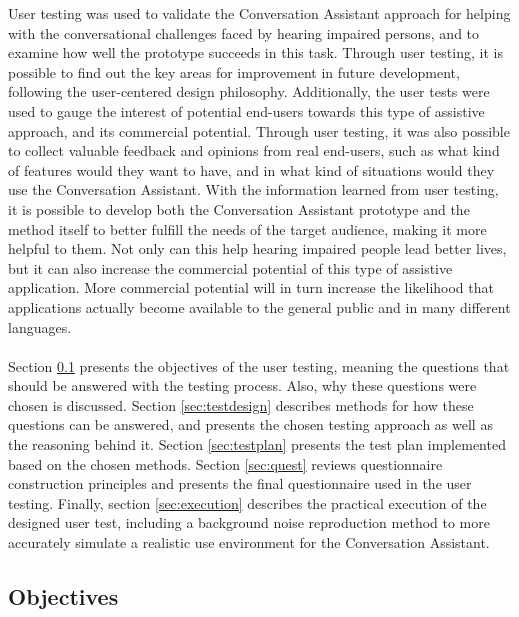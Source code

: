 \documentclass[english, 12pt, a4paper, pdftex, elec, utf8]{aaltothesis}
\begin{document}
User testing was used to validate the Conversation Assistant approach for helping with the conversational challenges faced by hearing impaired persons, and to examine how well the prototype succeeds in this task. Through user testing, it is possible to find out the key areas for improvement in future development, following the user-centered design philosophy. Additionally, the user tests were used to gauge the interest of potential end-users towards this type of assistive approach, and its commercial potential. Through user testing, it was also possible to collect valuable feedback and opinions from real end-users, such as what kind of features would they want to have, and in what kind of situations would they use the Conversation Assistant. With the information learned from user testing, it is possible to develop both the Conversation Assistant prototype and the method itself  to better fulfill the needs of the target audience, making it more helpful to them. Not only can this help hearing impaired people lead better lives, but it can also increase the commercial potential of this type of assistive application. More commercial potential will in turn increase the likelihood that applications actually become available to the general public and in many different languages. \\\\
Section \ref{sec:objectives} presents the objectives of the user testing, meaning the questions that should be answered with the testing process. Also, why these questions were chosen is discussed. Section \ref{sec:testdesign} describes methods for how these questions can be answered, and presents the chosen testing approach as well as the reasoning behind it. Section \ref{sec:testplan} presents the test plan implemented based on the chosen methods. Section \ref{sec:quest} reviews questionnaire construction principles and presents the final questionnaire used in the user testing. Finally, section \ref{sec:execution} describes the practical execution of the designed user test, including a background noise reproduction method to more accurately simulate a realistic use environment for the Conversation Assistant.

\subsection{Objectives} \label{sec:objectives}
\end{document}
